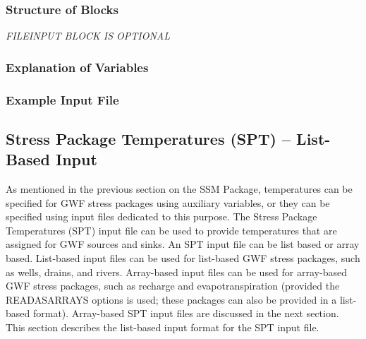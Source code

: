 \vspace{5mm}
\subsubsection{Structure of Blocks}


\vspace{5mm}
\noindent \textit{FILEINPUT BLOCK IS OPTIONAL}


\vspace{5mm}
\subsubsection{Explanation of Variables}
\begin{description}

\end{description}

\vspace{5mm}
\subsubsection{Example Input File}



\newpage
\subsection{Stress Package Temperatures (SPT) -- List-Based Input}
As mentioned in the previous section on the SSM Package, temperatures can be specified for GWF stress packages using auxiliary variables, or they can be specified using input files dedicated to this purpose.  The Stress Package Temperatures (SPT) input file can be used to provide temperatures that are assigned for GWF sources and sinks.  An SPT input file can be list based or array based.  List-based input files can be used for list-based GWF stress packages, such as wells, drains, and rivers.  Array-based input files can be used for array-based GWF stress packages, such as recharge and evapotranspiration (provided the READASARRAYS options is used; these packages can also be provided in a list-based format).  Array-based SPT input files are discussed in the next section.  This section describes the list-based input format for the SPT input file.  

